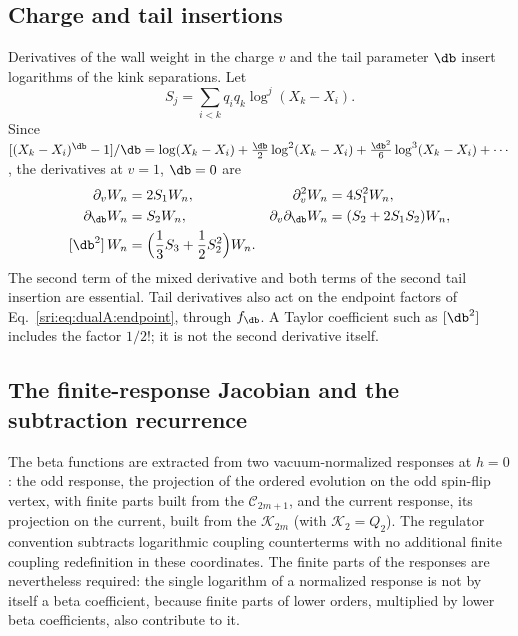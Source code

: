 \subsection{Charge and tail insertions}\label{sri:app:dualA:insertions}
Derivatives of the wall weight in the charge $v$ and the tail parameter $\db$ insert logarithms of the kink
separations. Let
\begin{equation}
 S_j=\sum_{i<k}q_iq_k\log^j(X_k-X_i).
\end{equation}
Since $[(X_k-X_i)^{\db}-1]/\db=\log(X_k-X_i)+\frac{\db}2\log^2(X_k-X_i)+\frac{\db^2}6\log^3(X_k-X_i)+\cdots$, the
derivatives at $v=1$, $\db=0$ are
\begin{equation}
\begin{aligned}
 \partial_vW_n&=2S_1W_n,&\partial_v^2W_n&=4S_1^2W_n,\\
 \partial_{\db}W_n&=S_2W_n,&\partial_v\partial_{\db}W_n&=(S_2+2S_1S_2)W_n,\\
 [\db^2]\,W_n&=\Bigl(\frac13S_3+\frac12S_2^2\Bigr)W_n.
\end{aligned}
\label{sri:eq:dualA:insertions}
\end{equation}
The second term of the mixed derivative and both terms of the second tail insertion are essential. Tail derivatives
also act on the endpoint factors of Eq.~\eqref{sri:eq:dualA:endpoint}, through $f_{\db}$. A Taylor coefficient such as
$[\db^2]$ includes the factor $1/2!$; it is not the second derivative itself.

\subsection{The finite-response Jacobian and the subtraction recurrence}\label{sri:app:dualA:recurrence}
The beta functions are extracted from two vacuum-normalized responses at $h=0$: the odd response, the projection of
the ordered evolution on the odd spin-flip vertex, with finite parts built from the $\mathcal C_{2m+1}$, and the
current response, its projection on the current, built from the $\mathcal K_{2m}$ (with $\mathcal K_2=Q_2$). The
regulator convention subtracts logarithmic coupling counterterms with no additional finite coupling redefinition in
these coordinates. The finite parts of the responses are nevertheless required: the single logarithm of a normalized
response is not by itself a beta coefficient, because finite parts of lower orders, multiplied by lower beta
coefficients, also contribute to it.

